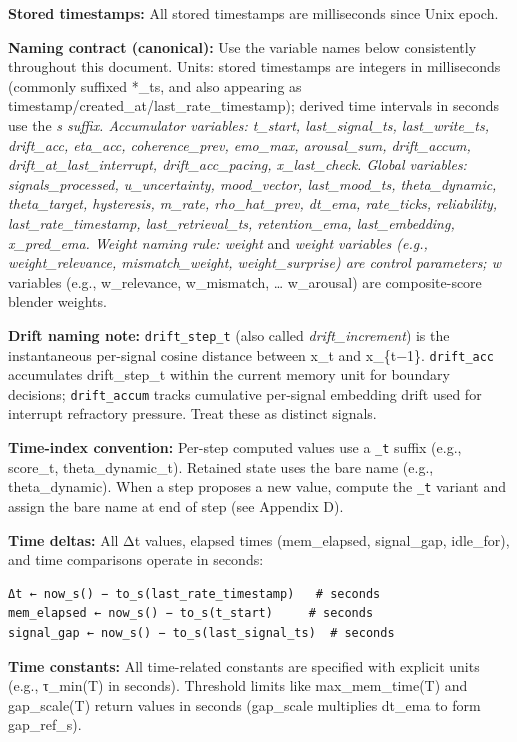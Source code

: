 \documentclass[
  letterpaper,
  DIV=11,
  numbers=noendperiod]{scrartcl}
\begin{document}
\textbf{Stored timestamps:} All stored timestamps are milliseconds since
Unix epoch.

\textbf{Naming contract (canonical):} Use the variable names below
consistently throughout this document. Units: stored timestamps are
integers in milliseconds (commonly suffixed *\_ts, and also appearing as
timestamp/created\_at/last\_rate\_timestamp); derived time intervals in
seconds use the \emph{\emph{s suffix. Accumulator variables: t\_start,
last\_signal\_ts, last\_write\_ts, drift\_acc, eta\_acc,
coherence\_prev, emo\_max, arousal\_sum, drift\_accum,
drift\_at\_last\_interrupt, drift\_acc\_pacing, x\_last\_check. Global
variables: signals\_processed, u\_uncertainty, mood\_vector,
last\_mood\_ts, theta\_dynamic, theta\_target, hysteresis, m\_rate,
rho\_hat\_prev, dt\_ema, rate\_ticks, reliability,
last\_rate\_timestamp, last\_retrieval\_ts, retention\_ema,
last\_embedding, x\_pred\_ema. Weight naming rule: weight}} and
\emph{\emph{weight variables (e.g., weight\_relevance, mismatch\_weight,
weight\_surprise) are control parameters; w}} variables (e.g.,
w\_relevance, w\_mismatch, \ldots{} w\_arousal) are composite-score
blender weights.

\textbf{Drift naming note:} \texttt{drift\_step\_t} (also called
\emph{drift\_increment}) is the instantaneous per-signal cosine distance
between x\_t and x\_\{t−1\}. \texttt{drift\_acc} accumulates
drift\_step\_t within the current memory unit for boundary decisions;
\texttt{drift\_accum} tracks cumulative per-signal embedding drift used
for interrupt refractory pressure. Treat these as distinct signals.

\textbf{Time-index convention:} Per-step computed values use a
\texttt{\_t} suffix (e.g., score\_t, theta\_dynamic\_t). Retained state
uses the bare name (e.g., theta\_dynamic). When a step proposes a new
value, compute the \texttt{\_t} variant and assign the bare name at end
of step (see Appendix D).

\textbf{Time deltas:} All Δt values, elapsed times (mem\_elapsed,
signal\_gap, idle\_for), and time comparisons operate in seconds:

\begin{verbatim}
Δt ← now_s() − to_s(last_rate_timestamp)   # seconds
mem_elapsed ← now_s() − to_s(t_start)     # seconds
signal_gap ← now_s() − to_s(last_signal_ts)  # seconds
\end{verbatim}

\textbf{Time constants:} All time-related constants are specified with
explicit units (e.g., τ\_min(T) in seconds). Threshold limits like
max\_mem\_time(T) and gap\_scale(T) return values in seconds (gap\_scale
multiplies dt\_ema to form gap\_ref\_s).
\end{document}
